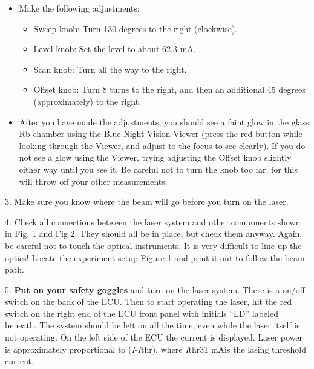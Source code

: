 \documentclass{../lab}
\begin{document}
\begin{itemize}
    \item Make the following adjustments:

    \begin{itemize}
        \item Sweep knob: Turn 130 degrees to the right (clockwise).

        \item Level knob: Set the level to about 62.3 mA.

        \item Scan knob: Turn all the way to the right.

        \item Offset knob: Turn 8 turns to the right, and then an additional 45 degrees (approximately) to the right.

    \end{itemize}

    \item After you have made the adjustments, you should see a faint glow in the glass Rb chamber using the Blue Night Vision Viewer (press the red button while looking through the Viewer, and adjust to the focus to see clearly). If you do not see a glow using the Viewer, trying adjusting the Offset knob slightly either way until you see it. Be careful not to turn the knob too far, for this will throw off your other measurements.

\end{itemize}

3.  Make sure you know where the beam will go before you turn on the laser.

4. Check all connections between the laser system and other components shown in Fig. 1 and Fig 2. They should all be in place, but check them anyway. Again, be careful not to touch the optical instruments. It is very difficult to line up the optics! Locate the experiment setup Figure 1 and print it out to follow the beam path.

5. \textbf{Put on your safety goggles} and turn on the laser system. There is a on/off switch on the back of the ECU. Then to start operating the laser, hit the red switch on the right end of the ECU front panel with initials ``LD'' labeled beneath. The system should be left on all the time, even while the laser itself is not operating. On the left side of the ECU the current is displayed. Laser power is approximately proportional to (\emph{I}-\emph{I}thr), where \emph{I}thr31 mAis the lasing threshold current.
\end{document}
